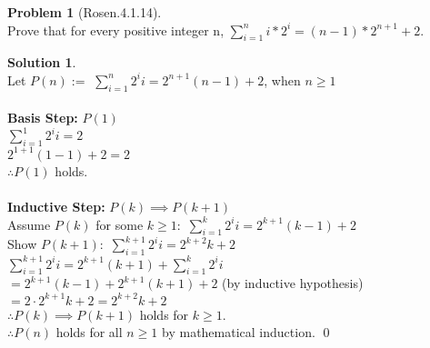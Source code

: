 \documentclass{article}
\theoremstyle{definition}
\newtheorem*{problem}{Problem}
\newtheorem*{solution}{Solution}
\begin{document}
\begin{problem}[Rosen.4.1.14]\ \\
Prove that for every positive integer n, $\displaystyle \sum_{i=1}^n i*2^i = (n-1)*2^{n+1}+2$.
\end{problem}

\begin{solution}\ \\
{\color{red}
\noindent
Let $P(n):=$ $\sum_{i=1}^{n} 2^{i} i = 2^{n + 1} \left(n - 1\right) + 2$, when $n\geq 1$\\
\\
\textbf{Basis Step:} $P(1)$ \\

$\sum_{i=1}^{1} 2^{i} i = 2$\\

$2^{1 + 1} \left(1 - 1\right) + 2 = 2$\\

$\therefore  P(1)$ holds.\\
\\
\textbf{Inductive Step:} $P(k)\implies P(k+1)$\\

Assume $P(k)$ for some $k\geq 1:$ $\sum_{i=1}^{k} 2^{i} i = 2^{k + 1} \left(k - 1\right) + 2$\\

Show $P(k+1):$ $\sum_{i=1}^{k + 1} 2^{i} i = 2^{k + 2} k + 2$\\

$\sum_{i=1}^{k + 1} 2^{i} i = 2^{k + 1} \left(k + 1\right) + \sum_{i=1}^{k} 2^{i} i$\\

$ = 2^{k + 1} \left(k - 1\right) + 2^{k + 1} \left(k + 1\right) + 2$  \hfill (by inductive hypothesis)\\

$ = 2 \cdot 2^{k+1} k + 2 = 2^{k + 2} k + 2$\\

$\therefore  P(k)\implies P(k+1)$ holds for $k \geq 1$.\\

\noindent
$\therefore P(n)$ holds for all $n \geq 1$ by mathematical induction. \qed
}
\end{solution}
\end{document}

